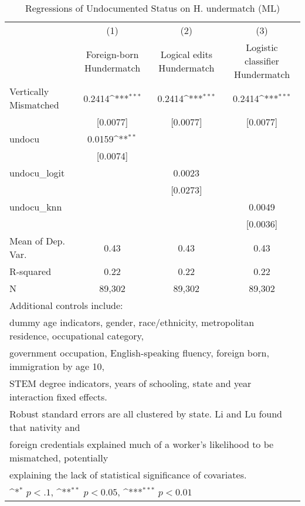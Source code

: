 \begin{table}[htbp]\centering
\def\sym#1{\ifmmode^{#1}\else\(^{#1}\)\fi}
\caption{Regressions of Undocumented Status on H. undermatch (ML)}
\begin{tabular}{l*{3}{c}}
\toprule
                    &\multicolumn{1}{c}{(1)}         &\multicolumn{1}{c}{(2)}         &\multicolumn{1}{c}{(3)}         \\
                    &Foreign-born Hundermatch         &Logical edits Hundermatch         &Logistic classifier Hundermatch         \\
\midrule
Vertically Mismatched&      0.2414\sym{***}&      0.2414\sym{***}&      0.2414\sym{***}\\
                    &    [0.0077]         &    [0.0077]         &    [0.0077]         \\
\addlinespace
undocu              &      0.0159\sym{**} &                     &                     \\
                    &    [0.0074]         &                     &                     \\
\addlinespace
undocu\_logit        &                     &      0.0023         &                     \\
                    &                     &    [0.0273]         &                     \\
\addlinespace
undocu\_knn          &                     &                     &      0.0049         \\
                    &                     &                     &    [0.0036]         \\
\midrule
Mean of Dep. Var.   &        0.43         &        0.43         &        0.43         \\
R-squared           &        0.22         &        0.22         &        0.22         \\
N                   &      89,302         &      89,302         &      89,302         \\
\bottomrule
\multicolumn{4}{l}{\footnotesize Additional controls include:}\\
\multicolumn{4}{l}{\footnotesize dummy age indicators, gender, race/ethnicity, metropolitan residence, occupational category,}\\
\multicolumn{4}{l}{\footnotesize government occupation, English-speaking fluency, foreign born, immigration by age 10,}\\
\multicolumn{4}{l}{\footnotesize STEM degree indicators, years of schooling, state and year interaction fixed effects.}\\
\multicolumn{4}{l}{\footnotesize Robust standard errors are all clustered by state. Li and Lu found that nativity and}\\
\multicolumn{4}{l}{\footnotesize foreign credentials explained much of a worker's likelihood to be mismatched, potentially}\\
\multicolumn{4}{l}{\footnotesize explaining the lack of statistical significance of covariates.}\\
\multicolumn{4}{l}{\footnotesize \sym{*} \(p<.1\), \sym{**} \(p<0.05\), \sym{***} \(p<0.01\)}\\
\end{tabular}
\end{table}
